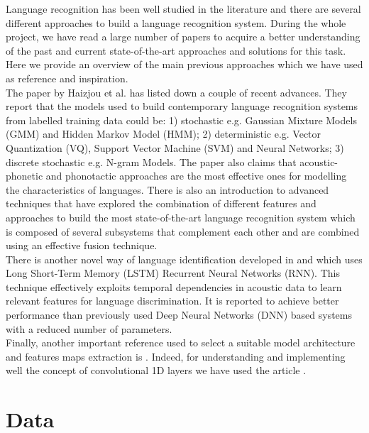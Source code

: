 \documentclass[12pt]{extarticle}
\begin{document}
\noindent Language recognition has been well studied in the literature and there are several different approaches to build a language recognition system. During the whole project, we have read a large number of papers to acquire a better understanding of the past and current state-of-the-art approaches and solutions for this task. Here we provide an overview of the main previous approaches which we have used as reference and inspiration.\\

\noindent The paper \cite{Li2013SpokenLR} by Haizjou et al. has listed down a couple of recent advances. They report that the models used to build contemporary language recognition systems from labelled training data could be: 1) stochastic e.g. Gaussian Mixture Models (GMM) and Hidden Markov Model (HMM); 2) deterministic e.g. Vector Quantization (VQ), Support Vector Machine (SVM) and Neural Networks; 3) discrete stochastic e.g. N-gram Models. The paper also claims that acoustic-phonetic and phonotactic approaches are the most effective ones for modelling the characteristics of languages. There is also an introduction to advanced techniques that have explored the combination of different features and approaches to build the most state-of-the-art language recognition system which is composed of several subsystems that complement each other and are combined using an effective fusion technique.\\

\noindent There is another novel way of language identification developed in \cite{42540} and \cite{Tang:2018:PTN:3180719.3180730} which uses Long Short-Term Memory (LSTM) Recurrent Neural Networks (RNN). This technique effectively exploits temporal dependencies in acoustic data to learn relevant features for language discrimination. It is reported to achieve better performance than previously used Deep Neural Networks (DNN) based systems with a reduced number of parameters.\\

\noindent Finally, another important reference used to select a suitable model architecture and features maps extraction is \cite{inproceedings}. Indeed, for understanding and implementing well the concept of convolutional 1D layers we have used the article \cite{Conv1DKeras}.

\section{Data} \label{Data}
\end{document}
